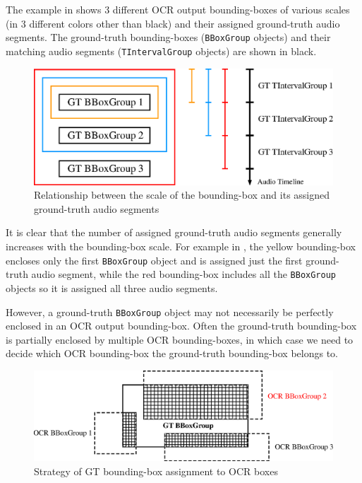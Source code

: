 The example in  shows 3 different OCR output bounding-boxes of various scales (in 3 different colors other than black) and their assigned ground-truth audio segments. The ground-truth bounding-boxes (\texttt{BBoxGroup} objects) and their matching audio segments (\texttt{TIntervalGroup} objects) are shown in black. 

\begin{figure}[!tb]
    \centering
    \includegraphics[width=.8\textwidth]{eval-align-scale.eps}
    \caption{Relationship between the scale of the bounding-box and its assigned ground-truth audio segments}
    \label{fig:eval-align-scale}
\end{figure}

It is clear that the number of assigned ground-truth audio segments generally increases with the bounding-box scale. For example in , the yellow bounding-box encloses only the first \texttt{BBoxGroup} object and is assigned just the first ground-truth audio segment, while the red bounding-box includes all the \texttt{BBoxGroup} objects so it is assigned all three audio segments.

However, a ground-truth \texttt{BBoxGroup} object may not necessarily be perfectly enclosed in an OCR output bounding-box. Often the ground-truth bounding-box is partially enclosed by multiple OCR bounding-boxes, in which case we need to decide which OCR bounding-box the ground-truth bounding-box belongs to.

\begin{figure}[!htb]
    \centering
    \includegraphics[width=.8\textwidth]{eval-gt-assign.eps}
    \caption{Strategy of GT bounding-box assignment to OCR boxes}
    \label{fig:eval-gt-assign}
\end{figure}

